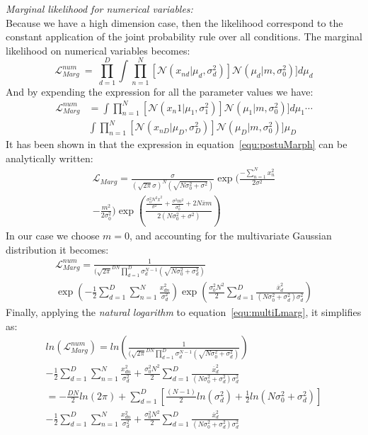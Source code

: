 \documentclass[twocolumn]{article}
\begin{document}
\emph{Marginal likelihood for numerical variables:}\\
Because we have a high dimension case, then the likelihood correspond to the constant application of the joint probability rule over all conditions.
The marginal likelihood on numerical variables becomes:
\begin{equation}
    \mathcal{L}_{Marg}^{num}\ =\ \prod_{d=1}^D\int\prod_{n=1}^N[\mathcal{N}(x_{nd}|\mu_d,\sigma_d^2)]\mathcal{N}(\mu_d|m,\sigma_0^2)]d\mu_d
\end{equation}
And by expending the expression for all the parameter values we have:
\begin{align}
    \mathcal{L}_{Marg}^{num} &= \int\prod_{n=1}^N[\mathcal{N}(x_n{1}|\mu_1,\sigma_1^2)]\mathcal{N}(\mu_1|m,\sigma_0^2)]d\mu_1\cdots \nonumber \\
    &\int\prod_{n=1}^N[\mathcal{N}(x_{nD}|\mu_D,\sigma_D^2)]\mathcal{N}(\mu_D|m,\sigma_0^2)]\mu_D
\end{align}
It has been shown in \cite{murphy} that the expression in equation~\ref{equ:postuMarph} can be analytically written:
\begin{align}
\mathcal{L}_{Marg} = \frac{\sigma}{(\sqrt{2\pi}\sigma)^N(\sqrt{N\sigma_0^2+\sigma^2})}\exp(\frac{-\sum_{n=1}^Nx_n^2}{2\sigma^2}\nonumber\\
    -\frac{m^2}{2\sigma_0^2})\exp(\frac{\frac{\sigma_0^2N^2\overline{x}^2}{\sigma^2}+\frac{\sigma^2m^2}{\sigma_0^2}+2N\overline{x}m}{2(N\sigma_0^2+\sigma^2)})
\end{align}
In our case we choose $m=0$, and accounting for the multivariate Gaussian distribution it becomes:
\begin{align}
\mathcal{L}_{Marg}^{num} = \frac{1}{(\sqrt{2\pi}^{DN}\prod_{d=1}^D\sigma_d^{N-1}(\sqrt{N\sigma_0^2+\sigma_d^2})}\nonumber\\
    \exp(-\frac{1}{2}\sum_{d=1}^D\sum_{n=1}^N\frac{x_{dn}^2}{\sigma_d^2})\exp(\frac{\sigma_0^2N^2}{2}\sum_{d=1}^D\frac{\overline{x}_d^2}{(N\sigma_0^2+\sigma_d^2)\sigma_d^2})
    \label{equ:multiLmarg}
\end{align}
Finally, applying the \emph{natural logarithm} to equation~\ref{equ:multiLmarg}, it simplifies as:
\small{
\begin{align}\label{equ:lnLikeNum}
ln(\mathcal{L}_{Marg}^{num})= ln(\frac{1}{(\sqrt{2\pi}^{DN}\prod_{d=1}^D\sigma_d^{N-1}(\sqrt{N\sigma_0^2+\sigma_d^2})})\nonumber \\
-\frac{1}{2}\sum_{d=1}^D\sum_{n=1}^N\frac{x_{dn}^2}{\sigma_d^2}+\frac{\sigma_0^2N^2}{2}\sum_{d=1}^D\frac{\overline{x}_d^2}{(N\sigma_0^2+\sigma_d^2)\sigma_d^2}\nonumber\\
= -\frac{DN}{2}ln(2\pi)+\sum_{d=1}^D[\frac{(N-1)}{2}ln(\sigma_d^2)+\frac{1}{2}ln(N\sigma_0^2+\sigma_d^2)]\nonumber\\
-\frac{1}{2}\sum_{d=1}^D\sum_{n=1}^N\frac{x_{dn}^2}{\sigma_d^2}+\frac{\sigma_0^2N^2}{2}\sum_{d=1}^D\frac{\overline{x}_d^2}{(N\sigma_0^2+\sigma_d^2)\sigma_d^2}
\end{align}
}
\end{document}
